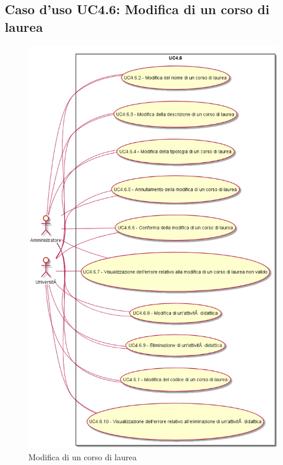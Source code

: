 \subsection{Caso d'uso \texorpdfstring{UC4.6}{UC4.6}: Modifica di un corso di laurea}
\begin{figure} [H]
\centering
\includegraphics[scale=0.45]{./img/UC4-6.png}
\caption{Modifica di un corso di laurea}\label{}
\end{figure}
